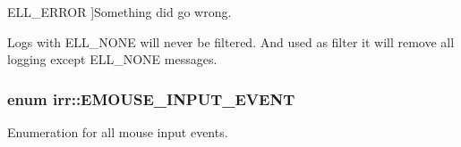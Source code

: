 \begin{Desc}
\begin{description}
{E\+L\+L\+\_\+\+E\+R\+R\+OR\hypertarget{namespaceirr_aa2d1cac68606a25ed24cfffccfa30a92a1c16e615e15fc3f75bacb50faaeb73ff}{}\label{namespaceirr_aa2d1cac68606a25ed24cfffccfa30a92a1c16e615e15fc3f75bacb50faaeb73ff}
}]Something did go wrong. \item[{\em 
E\+L\+L\+\_\+\+N\+O\+NE\hypertarget{namespaceirr_aa2d1cac68606a25ed24cfffccfa30a92a558fe286a76cbba090c8301f7b1f7dcb}{}\label{namespaceirr_aa2d1cac68606a25ed24cfffccfa30a92a558fe286a76cbba090c8301f7b1f7dcb}
}]Logs with E\+L\+L\+\_\+\+N\+O\+NE will never be filtered. And used as filter it will remove all logging except E\+L\+L\+\_\+\+N\+O\+NE messages. \end{description}
\end{Desc}
\subsubsection[{\texorpdfstring{E\+M\+O\+U\+S\+E\+\_\+\+I\+N\+P\+U\+T\+\_\+\+E\+V\+E\+NT}{EMOUSE\_INPUT\_EVENT}}]{\setlength{\rightskip}{0pt plus 5cm}enum {\bf irr\+::\+E\+M\+O\+U\+S\+E\+\_\+\+I\+N\+P\+U\+T\+\_\+\+E\+V\+E\+NT}}\hypertarget{namespaceirr_a2dbf2a247aa17a9eeefbbf36ebd5739f}{}\label{namespaceirr_a2dbf2a247aa17a9eeefbbf36ebd5739f}


Enumeration for all mouse input events. 

